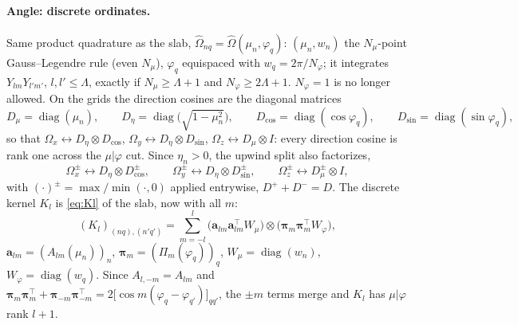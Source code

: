 \documentclass[11pt,a4paper]{article}
\newcommand{\Om}{\hat{\Omega}}
\newcommand{\kron}{\otimes}
\newcommand{\Lmax}{\Lambda}
\newcommand{\diag}{\operatorname{diag}}
\begin{document}
\paragraph{Angle: discrete ordinates.} Same product quadrature as the slab, $\Om_{nq}=\Om(\mu_n,\varphi_q)$: $(\mu_n,w_n)$ the $N_\mu$-point Gauss--Legendre rule (even $N_\mu$), $\varphi_q$ equispaced with $w_q=2\pi/N_\varphi$; it integrates $Y_{lm}Y_{l'm'}$, $l,l'\le\Lmax$, exactly if $N_\mu\ge\Lmax+1$ and $N_\varphi\ge2\Lmax+1$. $N_\varphi=1$ is no longer allowed. On the grids the direction cosines are the diagonal matrices
\begin{equation}
D_\mu=\diag(\mu_n),\qquad D_\eta=\diag\big(\sqrt{1-\mu_n^2}\big),\qquad
D_{\cos}=\diag(\cos\varphi_q),\qquad D_{\sin}=\diag(\sin\varphi_q),
\end{equation}
so that $\Omega_x\leftrightarrow D_\eta\kron D_{\cos}$, $\Omega_y\leftrightarrow D_\eta\kron D_{\sin}$, $\Omega_z\leftrightarrow D_\mu\kron I$: every direction cosine is rank one across the $\mu|\varphi$ cut. Since $\eta_n>0$, the upwind split also factorizes,
\begin{equation}
\Omega_x^\pm\leftrightarrow D_\eta\kron D^\pm_{\cos},\qquad \Omega_y^\pm\leftrightarrow D_\eta\kron D^\pm_{\sin},\qquad \Omega_z^\pm\leftrightarrow D^\pm_\mu\kron I,
\label{eq:upwind-split}
\end{equation}
with $(\cdot)^\pm=\max/\min(\cdot,0)$ applied entrywise, $D^+ + D^-=D$. The discrete kernel $K_l$ is \eqref{eq:Kl} of the slab, now with all $m$:
\begin{equation}
(K_l)_{(nq),(n'q')}=\sum_{m=-l}^{l}\big(\bm a_{lm}\bm a_{lm}^{\!\top}W_\mu\big)\kron\big(\bm\pi_m\bm\pi_m^{\!\top}W_\varphi\big),
\label{eq:Kl}
\end{equation}
$\bm a_{lm}=(A_{lm}(\mu_n))_n$, $\bm\pi_m=(\Pi_m(\varphi_q))_q$, $W_\mu=\diag(w_n)$, $W_\varphi=\diag(w_q)$. Since $A_{l,-m}=A_{lm}$ and $\bm\pi_m\bm\pi_m^{\!\top}+\bm\pi_{-m}\bm\pi_{-m}^{\!\top}=2\big[\cos m(\varphi_q-\varphi_{q'})\big]_{qq'}$, the $\pm m$ terms merge and $K_l$ has $\mu|\varphi$ rank $l+1$.
\end{document}
